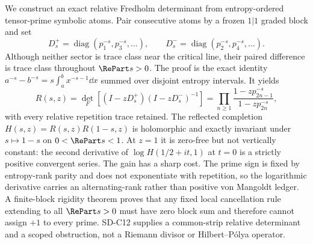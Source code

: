 We construct an exact relative Fredholm determinant from entropy-ordered
tensor-prime symbolic atoms.  Pair consecutive atoms by a frozen $1|1$
graded block and set
\[
 D_s^+=\operatorname{diag}(p_1^{-s},p_3^{-s},\ldots),\qquad
 D_s^-=\operatorname{diag}(p_2^{-s},p_4^{-s},\ldots).
\]
Although neither sector is trace class near the critical line, their paired
difference is trace class throughout $\RePart s>0$.  The proof is the exact
identity $a^{-s}-b^{-s}=s\int_a^b x^{-s-1}\dd x$ summed over disjoint
entropy intervals.  It yields
\[
 R(s,z)=\det_{\!F}\!\left[(I-zD_s^+)(I-zD_s^-)^{-1}\right]
 =\prod_{n\ge1}\frac{1-zp_{2n-1}^{-s}}{1-zp_{2n}^{-s}},
\]
with every relative repetition trace retained.  The reflected completion
$H(s,z)=R(s,z)R(1-s,z)$ is holomorphic and exactly invariant under
$s\mapsto1-s$ on $0<\RePart s<1$.  At $z=1$ it is zero-free but not
vertically constant: the second derivative of
$\log H(1/2+it,1)$ at $t=0$ is a strictly positive convergent series.
The gain has a sharp cost.  The prime sign is fixed by entropy-rank parity and
does not exponentiate with repetition, so the logarithmic derivative carries
an alternating-rank rather than positive von Mangoldt ledger.  A finite-block
rigidity theorem proves that any fixed local cancellation rule extending to
all $\RePart s>0$ must have zero block sum and therefore cannot assign $+1$
to every prime.  SD-C12 supplies a common-strip relative determinant and a
scoped obstruction, not a Riemann divisor or Hilbert--P\'olya operator.

